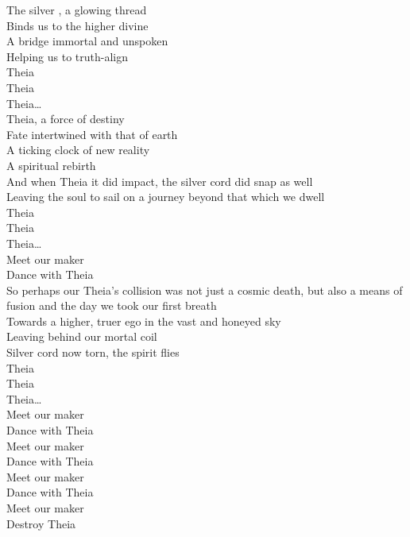 



The silver , a glowing thread\\
Binds us to the higher divine\\
A bridge immortal and unspoken\\
Helping us to truth-align\\

Theia\\
Theia\\
Theia…\\

Theia, a force of destiny\\
Fate intertwined with that of earth\\
A ticking clock of new reality\\
A spiritual rebirth\\
And when Theia it did impact, the silver cord did snap as well\\
Leaving the soul to sail on a journey beyond that which we dwell\\

Theia\\
Theia\\
Theia…\\

Meet our maker\\
Dance with Theia\\

So perhaps our Theia's collision was not just a cosmic death, but also a means of fusion and the day we took our first breath\\
Towards a higher, truer ego in the vast and honeyed sky\\
Leaving behind our mortal coil\\
Silver cord now torn, the spirit flies\\

Theia\\
Theia\\
Theia…\\

Meet our maker\\
Dance with Theia\\
Meet our maker\\
Dance with Theia\\
Meet our maker\\
Dance with Theia\\
Meet our maker\\
Destroy Theia\\

